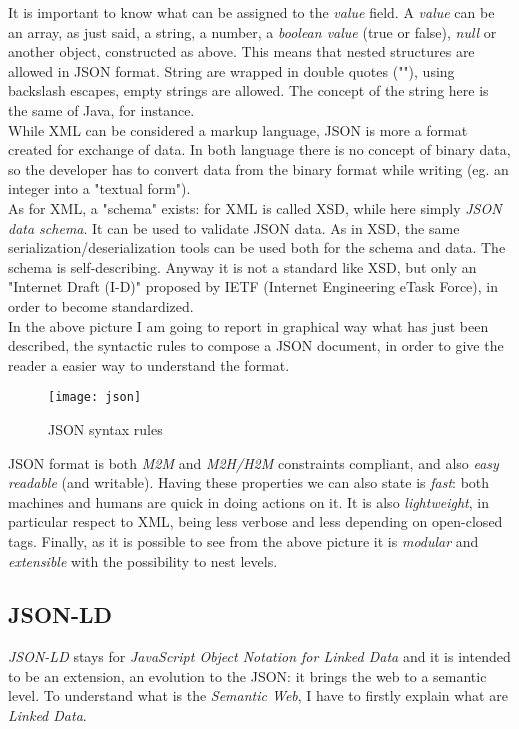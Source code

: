 It is important to know what can be assigned to the \textit{value} field. A \textit{value} can be an array, as just said, a string, a number, a \textit{boolean value} (true or false), \textit{null} or another object, constructed as above. This means that nested structures are allowed in JSON format. String are wrapped in double quotes (""), using backslash escapes, empty strings are allowed. The concept of the string here is the same of Java, for instance. \\
While XML can be considered a markup language, JSON is more a format created for exchange of data. In both language there is no concept of binary data, so the developer has to convert data from the binary format while writing (eg. an integer into a "textual form").\\
As for XML, a "schema" exists: for XML is called XSD, while here simply \textit{JSON data schema}. It can be used to validate JSON data. As in XSD, the same serialization/deserialization tools can be used both for the schema and data. The schema is self-describing. Anyway it is not a standard like XSD, but only an "Internet Draft (I-D)" proposed by IETF (Internet Engineering eTask Force), in order to become standardized.\\
In the above picture I am going to report in graphical way what has just been described, the syntactic rules to compose a JSON document, in order to give the reader a easier way to understand the format.\\

\begin{figure}[h]
	\centering
	\texttt{[image: json]}
	\caption{JSON syntax rules}
	\label{4.3:json}
\end{figure}

JSON format is both \textit{M2M} and \textit{M2H/H2M} constraints compliant, and also \textit{easy readable} (and writable). Having these properties we can also state is \textit{fast}: both machines and humans are quick in doing actions on it. It is also \textit{lightweight}, in particular respect to XML, being less verbose and less depending on open-closed tags. Finally, as it is possible to see from the above picture it is \textit{modular} and \textit{extensible} with the possibility to nest levels. 

\subsection{JSON-LD}
\textit{JSON-LD} stays for \textit{JavaScript Object Notation for Linked Data} and it is intended to be an extension, an evolution to the JSON: it brings the web to a semantic level. To understand what is the \textit{Semantic Web}, I have to firstly explain what are \textit{Linked Data}.

